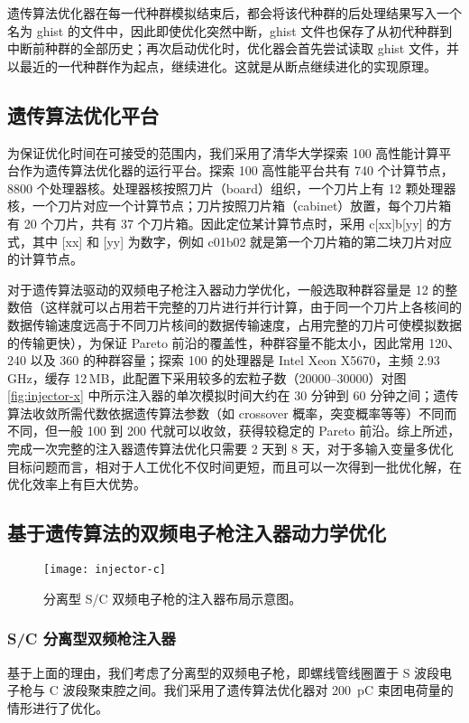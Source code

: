 遗传算法优化器在每一代种群模拟结束后，都会将该代种群的后处理结果写入一个名为 {\sf ghist} 的文件中，因此即使优化突然中断，{\sf ghist} 文件也保存了从初代种群到中断前种群的全部历史；再次启动优化时，优化器会首先尝试读取 {\sf ghist} 文件，并以最近的一代种群作为起点，继续进化。这就是从断点继续进化的实现原理。

\subsection{遗传算法优化平台}
为保证优化时间在可接受的范围内，我们采用了清华大学探索 100 高性能计算平台作为遗传算法优化器的运行平台。探索 100 高性能平台共有 740 个计算节点，8800 个处理器核。处理器核按照刀片（board）组织，一个刀片上有 12 颗处理器核，一个刀片对应一个计算节点；刀片按照刀片箱（cabinet）放置，每个刀片箱有 20 个刀片，共有 37 个刀片箱。因此定位某计算节点时，采用 c[xx]b[yy] 的方式，其中 [xx] 和 [yy] 为数字，例如 c01b02 就是第一个刀片箱的第二块刀片对应的计算节点。

对于遗传算法驱动的双频电子枪注入器动力学优化，一般选取种群容量是 12 的整数倍（这样就可以占用若干完整的刀片进行并行计算，由于同一个刀片上各核间的数据传输速度远高于不同刀片核间的数据传输速度，占用完整的刀片可使模拟数据的传输更快），为保证 Pareto 前沿的覆盖性，种群容量不能太小，因此常用 120、240 以及 360 的种群容量；探索 100 的处理器是 Intel Xeon X5670，主频 2.93\,GHz，缓存 12\,MB，此配置下采用较多的宏粒子数（20000--30000）对图 \ref{fig:injector-x} 中所示注入器的单次模拟时间大约在 30 分钟到 60 分钟之间；遗传算法收敛所需代数依据遗传算法参数（如 crossover 概率，突变概率等等）不同而不同，但一般 100 到 200 代就可以收敛，获得较稳定的 Pareto 前沿。综上所述，完成一次完整的注入器遗传算法优化只需要 2 天到 8 天，对于多输入变量多优化目标问题而言，相对于人工优化不仅时间更短，而且可以一次得到一批优化解，在优化效率上有巨大优势。

\subsection{基于遗传算法的双频电子枪注入器动力学优化}

\begin{figure}[htbp]
	\centering
	\texttt{[image: injector-c]}	
	\caption{分离型 S/C 双频电子枪的注入器布局示意图。}
	\label{fig:injector-c}
\end{figure}

\subsubsection{S/C 分离型双频枪注入器}
基于上面的理由，我们考虑了分离型的双频电子枪，即螺线管线圈置于 S 波段电子枪与 C 波段聚束腔之间。我们采用了遗传算法优化器对 \SI{200}{pC} 束团电荷量的情形进行了优化。

